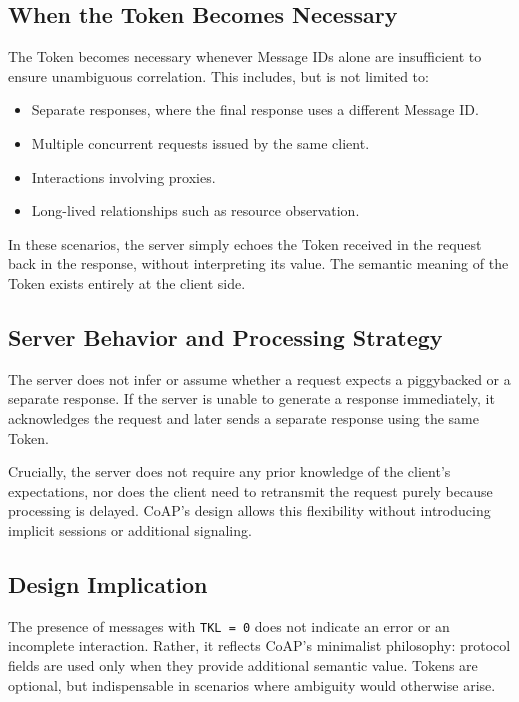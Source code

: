 \documentclass{scrbook}
\begin{document}
\subsection{When the Token Becomes Necessary}

The Token becomes necessary whenever Message IDs alone are insufficient to ensure unambiguous correlation. This includes, but is not limited to:

\begin{itemize}
    \item Separate responses, where the final response uses a different Message ID.
    \item Multiple concurrent requests issued by the same client.
    \item Interactions involving proxies.
    \item Long-lived relationships such as resource observation.
\end{itemize}

In these scenarios, the server simply echoes the Token received in the request back in the response, without interpreting its value. The semantic meaning of the Token exists entirely at the client side.

\subsection{Server Behavior and Processing Strategy}

The server does not infer or assume whether a request expects a piggybacked or a separate response. If the server is unable to generate a response immediately, it acknowledges the request and later sends a separate response using the same Token.

Crucially, the server does not require any prior knowledge of the client’s expectations, nor does the client need to retransmit the request purely because processing is delayed. CoAP’s design allows this flexibility without introducing implicit sessions or additional signaling.

\subsection{Design Implication}

The presence of messages with \texttt{TKL = 0} does not indicate an error or an incomplete interaction. Rather, it reflects CoAP’s minimalist philosophy: protocol fields are used only when they provide additional semantic value. Tokens are optional, but indispensable in scenarios where ambiguity would otherwise arise.
\end{document}
